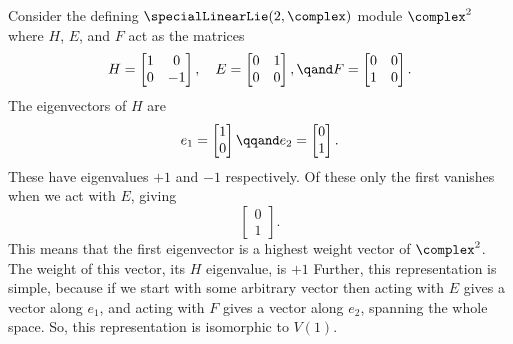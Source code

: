 \documentclass[fleqn]{NotesClass}
\begin{document}
    Consider the defining \(\specialLinearLie(2, \complex)\) module \(\complex^2\) where \(H\), \(E\), and \(F\) act as the matrices
    \begin{equation}
        H =
        \begin{bmatrix}
            1 & 0\\
            0 & -1
        \end{bmatrix}
        , \quad E = 
        \begin{bmatrix}
            0 & 1\\
            0 & 0
        \end{bmatrix}
        , \qand F = 
        \begin{bmatrix}
            0 & 0\\
            1 & 0
        \end{bmatrix}
        .
    \end{equation}
    The eigenvectors of \(H\) are
    \begin{equation}
        e_1 = 
        \begin{bmatrix}
            1\\ 0
        \end{bmatrix}
        \qqand
        e_2 =  
        \begin{bmatrix}
            0\\ 1
        \end{bmatrix}
        .
    \end{equation}
    These have eigenvalues \(+1\) and \(-1\) respectively.
    Of these only the first vanishes when we act with \(E\), giving
    \begin{equation}
        \begin{bmatrix}
            0\\ 1
        \end{bmatrix}
        .
    \end{equation}
    This means that the first eigenvector is a highest weight vector of \(\complex^2\).
    The weight of this vector, its \(H\) eigenvalue, is \(+1\)
    Further, this representation is simple, because if we start with some arbitrary vector then acting with \(E\) gives a vector along \(e_1\), and acting with \(F\) gives a vector along \(e_2\), spanning the whole space. So, this representation is isomorphic to \(V(1)\).
    
\end{document}
